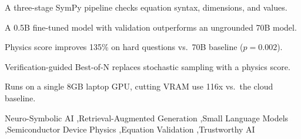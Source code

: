 \documentclass[a4paper,fleqn]{cas-sc}
\begin{document}
\begin{highlights}
\item A three-stage SymPy pipeline checks equation syntax, dimensions, and values.
\item A 0.5B fine-tuned model with validation outperforms an ungrounded 70B model.
\item Physics score improves 135\% on hard questions vs.\ 70B baseline ($p=0.002$).
\item Verification-guided Best-of-N replaces stochastic sampling with a physics score.
\item Runs on a single 8GB laptop GPU, cutting VRAM use 116x vs.\ the cloud baseline.
\end{highlights}

\begin{keywords}
Neuro-Symbolic AI \sep Retrieval-Augmented Generation \sep Small Language Models \sep Semiconductor Device Physics \sep Equation Validation \sep Trustworthy AI
\end{keywords}

\maketitle

\end{document}
